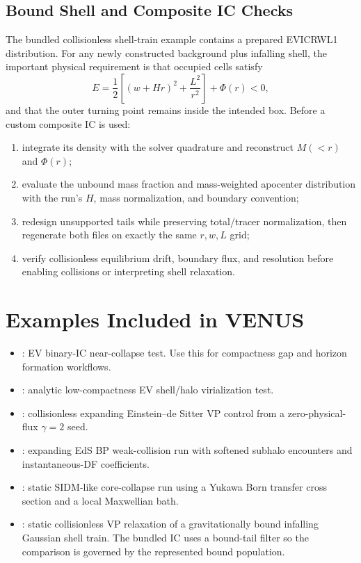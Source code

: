 \documentclass[11pt]{article}
\begin{document}
\subsection{Bound Shell and Composite IC Checks}

The bundled collisionless shell-train example contains a prepared EVICRWL1
distribution.  For any newly constructed background plus infalling shell,
the important physical requirement is that occupied cells satisfy
\[
  E=\frac{1}{2}\left[(w+Hr)^2+\frac{L^2}{r^2}\right]+\Phi(r)<0,
\]
and that the outer turning point remains inside the intended box.  Before a
custom composite IC is used:
\begin{enumerate}
\item integrate its density with the solver quadrature and reconstruct
\(M(<r)\) and \(\Phi(r)\);
\item evaluate the unbound mass fraction and mass-weighted apocenter
distribution with the run's \(H\), mass normalization, and boundary
convention;
\item redesign unsupported tails while preserving total/tracer normalization,
then regenerate both files on exactly the same \(r,w,L\) grid;
\item verify collisionless equilibrium drift, boundary flux, and resolution
before enabling collisions or interpreting shell relaxation.
\end{enumerate}

\section{Examples Included in VENUS}

\begin{itemize}
\item {}:
EV binary-IC near-collapse test.  Use this for compactness gap and horizon
formation workflows.
\item {}:
analytic low-compactness EV shell/halo virialization test.
\item {}:
collisionless expanding Einstein--de Sitter VP control from a zero-physical-flux
\(\gamma=2\) seed.
\item {}:
expanding EdS BP weak-collision run with softened subhalo encounters and
instantaneous-DF coefficients.
\item {}: static SIDM-like
core-collapse run using a Yukawa Born transfer cross section and a local
Maxwellian bath.
\item {}:
static collisionless VP relaxation of a gravitationally bound infalling
Gaussian shell train.  The bundled IC uses a bound-tail filter so the
comparison is governed by the represented bound population.
\end{itemize}
\end{document}
